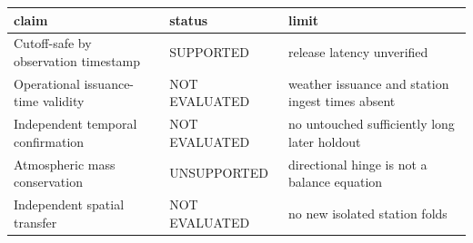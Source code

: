 \begin{tabular}{lll}
\hline
claim & status & limit \\
\hline
Cutoff-safe by observation timestamp & SUPPORTED & release latency unverified \\
Operational issuance-time validity & NOT EVALUATED & weather issuance and station ingest times absent \\
Independent temporal confirmation & NOT EVALUATED & no untouched sufficiently long later holdout \\
Atmospheric mass conservation & UNSUPPORTED & directional hinge is not a balance equation \\
Independent spatial transfer & NOT EVALUATED & no new isolated station folds \\
\hline
\end{tabular}
